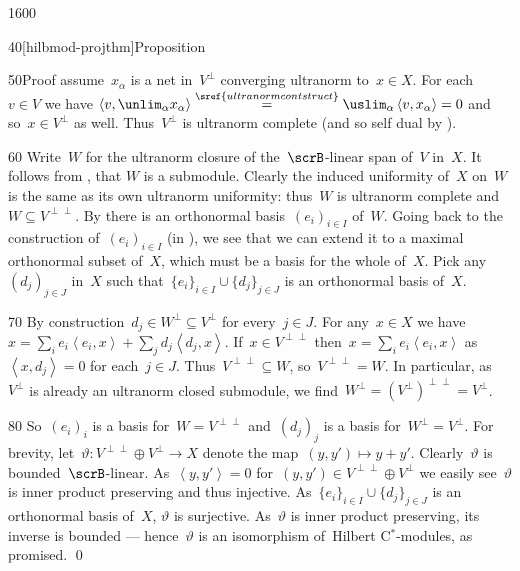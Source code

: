 \begin{parsec}{1600}
\begin{point}{40}[hilbmod-projthm]{Proposition}
\begin{point}{50}{Proof}
    assume~$x_\alpha$ is a net in~$V^\perp$
    converging ultranorm to~$x \in X$.
For each~$v \in V$ we have
$ \left<v, \unlim_\alpha x_\alpha\right>
    \overset{\sref{ultranormcontstruct}}{=}
    \uslim_\alpha \left<v, x_\alpha\right>  = 0 $
    and so~$x \in V^\perp$ as well.
Thus~$V^\perp$ is ultranorm complete
    (and so self dual by ).
\begin{point}{60}%
Write~$W$ for the ultranorm closure of
    the~$\scrB$-linear span of~$V$ in~$X$.
It follows from , that $W$ is a submodule.
Clearly the induced uniformity of~$X$
    on~$W$ is the same as its own ultranorm uniformity:
    thus~$W$ is ultranorm complete
        and~$W \subseteq V^{\perp\perp}$.
By  there
    is an orthonormal basis~$(e_i)_{i \in I}$ of~$W$.
Going back to the construction of~$(e_i)_{i \in I}$
    (in ),
    we see that we can extend it to a maximal orthonormal subset of~$X$,
    which must be a basis for the whole of~$X$.
Pick any~$(d_j)_{j \in J} $ in~$X$
    such that~$\{e_i\}_{i \in I} \cup \{d_j\}_{j \in J}$
    is an orthonormal basis of~$X$.
\end{point}
\begin{point}{70}%
By construction~$d_j \in W^\perp \subseteq V^\perp$
    for every~$j \in J$.
For any~$x \in X$
    we have~$x = \sum_i e_i \left<e_i, x\right>
                + \sum_j d_j \left<d_j,x\right>$.
If~$x \in V^{\perp\perp}$
    then~$x = \sum_i e_i \left<e_i, x\right>$
    as~$\left<x, d_j\right>= 0$ for each~$j \in J$.
Thus~$V^{\perp\perp} \subseteq W$, so~$V^{\perp\perp} = W$.
In particular, as~$V^\perp$ is already an ultranorm closed submodule,
    we find~$W^\perp = (V^\perp)^{\perp\perp} = V^\perp$.
\end{point}
\begin{point}{80}%
So~$(e_i)_i$ is a basis for~$W = V^{\perp\perp}$
    and~$(d_j)_j$ is a basis for~$W^\perp = V^\perp$.
For brevity, let~$\vartheta\colon V^{\perp\perp} \oplus V^\perp \to X$
    denote the map~$(y,y') \mapsto y+y'$.
Clearly~$\vartheta$ is bounded~$\scrB$-linear.
As~$\left<y,y'\right> = 0$ for~$(y,y') \in V^{\perp\perp} \oplus V^\perp$
    we easily see~$\vartheta$ is inner product preserving and thus injective.
As~$\{e_i\}_{i \in I} \cup \{d_j\}_{j \in J}$
    is an orthonormal basis of~$X$, $\vartheta$ is surjective.
As~$\vartheta$ is inner product preserving, its inverse is bounded
    --- hence~$\vartheta$ is an isomorphism of~Hilbert C$^*$-modules,
    as promised.
    \qed
\end{point}

\end{point}
\end{point}
\end{parsec}
